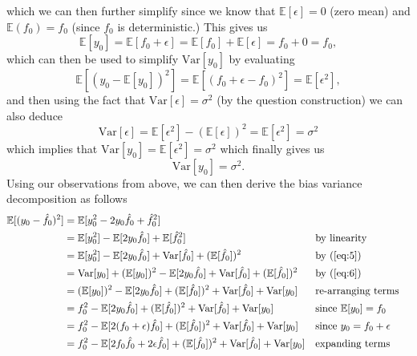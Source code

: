 \documentclass [10pt]{article}
\begin{document}
\begin{enumerate}
\begin{enumerate}
\begin{equation}
		\end{equation}
		which we can then further simplify since we know that $\mathbb{E}[\epsilon]=0$ (zero mean) and $\mathbb{E}(f_{0}) = f_{0}$ (since $f_{0}$ is deterministic.) This gives us$$\mathbb{E}[y_{0}]=\mathbb{E}[f_{0}+\epsilon]=\mathbb{E}[f_{0}]+\mathbb{E}[\epsilon]=f_{0}+0=f_{0},$$which can then be used to simplify $\text{Var}[y_{0}]$ by evaluating$$\mathbb{E}[(y_{0}-\mathbb{E}[y_{0}])^{2}]=\mathbb{E}[(f_{0}+\epsilon-f_{0})^{2}]=\mathbb{E}[\epsilon^{2}],$$ and then using the fact that $\text{Var}[\epsilon]=\sigma^{2}$ (by the question construction) we can also deduce $$\text{Var}[\epsilon]=\mathbb{E}[\epsilon^{2}]-(\mathbb{E}[\epsilon])^{2}=\mathbb{E}[\epsilon^{2}]=\sigma^{2}$$which implies that $\text{Var}[y_{0}]=\mathbb{E}[\epsilon^{2}]=\sigma^{2}$ which finally gives us
		\begin{equation}\label{eq:7}
			\text{Var}[y_{0}] = \sigma^{2}.
		\end{equation}
		Using our observations from above, we can then derive the bias variance decomposition as follows
		\begin{align}
			\mathbb{E}[(y_{0}-\hat{f}_{0})^{2}]&=\mathbb{E}[y_{0}^{2}-2y_{0}\hat{f}_{0}+\hat{f}_{0}^{2}]\nonumber\\
			&=\mathbb{E}[y_{0}^{2}]-\mathbb{E}[2y_{0}\hat{f}_{0}]+\mathbb{E}[\hat{f}_{0}^{2}]&&\text{by linearity}\nonumber\\
			&=\mathbb{E}[y_{0}^{2}]-\mathbb{E}[2y_{0}\hat{f}_{0}]+\text{Var}[\hat{f}_{0}]+(\mathbb{E}[\hat{f}_{0}])^{2}&&\text{by (\ref{eq:5})}\nonumber\\
			&=\text{Var}[y_{0}]+(\mathbb{E}[y_{0}])^{2}-\mathbb{E}[2y_{0}\hat{f}_{0}]+\text{Var}[\hat{f}_{0}]+(\mathbb{E}[\hat{f}_{0}])^{2}&&\text{by (\ref{eq:6})}\nonumber\\
			&=(\mathbb{E}[y_{0}])^{2}-\mathbb{E}[2y_{0}\hat{f}_{0}]+(\mathbb{E}[\hat{f}_{0}])^{2}+\text{Var}[\hat{f}_{0}]+\text{Var}[y_{0}]&&\text{re-arranging terms}\nonumber\\
			&=f_{0}^{2}-\mathbb{E}[2y_{0}\hat{f}_{0}]+(\mathbb{E}[\hat{f}_{0}])^{2}+\text{Var}[\hat{f}_{0}]+\text{Var}[y_{0}]&&\text{since $\mathbb{E}[y_{0}]=f_{0}$}\nonumber\\
			&=f_{0}^{2}-\mathbb{E}[2(f_{0}+\epsilon)\hat{f}_{0}]+(\mathbb{E}[\hat{f}_{0}])^{2}+\text{Var}[\hat{f}_{0}]+\text{Var}[y_{0}]&&\text{since $y_{0}=f_{0}+\epsilon$}\nonumber\\
			&=f_{0}^{2}-\mathbb{E}[2f_{0}\hat{f}_{0}+2\epsilon\hat{f}_{0}]+(\mathbb{E}[\hat{f}_{0}])^{2}+\text{Var}[\hat{f}_{0}]+\text{Var}[y_{0}]&&\text{expanding terms}\nonumber\\

\end{align}
\end{enumerate}
\end{enumerate}
\end{document}
